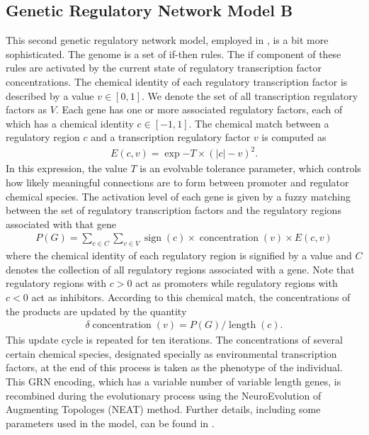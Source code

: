 \subsection{Genetic Regulatory Network Model B} \label{sec:complex_grn}

This second genetic regulatory network model, employed in \cite{Reisinger2007AcquiringRepresentations}, is a bit more sophisticated. The genome is a set of if-then rules. The if component of these rules are activated by the current state of regulatory transcription factor concentrations. The chemical identity of each regulatory transcription factor is described by a value $v \in [0,1]$. We denote the set of all transcription regulatory factors as $V$. Each gene has one or more associated regulatory factors, each of which has a chemical identity $c \in [-1,1]$. The chemical match between a regulatory region $c$ and a transcription regulatory factor $v$ is computed as
\begin{align*}
E(c,v) = \exp{-T \times (|c| - v)^2}.
\end{align*}
In this expression, the value $T$ is an evolvable tolerance parameter, which controls how likely meaningful connections are to form between promoter and regulator chemical species. The activation level of each gene is given by a fuzzy matching between the set of regulatory transcription factors and the regulatory regions associated with that gene
\begin{align*}
P(G) = \sum_{c\in C} \sum_{v \in V} \operatorname{sign}(c) \times \operatorname{concentration}(v) \times E(c,v)
\end{align*}
where the chemical identity of each regulatory region is signified by a value  and $C$ denotes the collection of all regulatory regions associated with a gene. Note that regulatory regions with $c > 0$ act as promoters while regulatory regions with $c < 0$ act as inhibitors. According to this chemical match, the concentrations of the products are updated by the quantity
\begin{align*}
\delta \operatorname{concentration}(v) = P(G)/\operatorname{length}(c).
\end{align*}
This update cycle is repeated for ten iterations. The concentrations of several certain chemical species, designated specially as environmental transcription factors, at the end of this process is taken as the phenotype of the individual. This GRN encoding, which has a variable number of variable length genes, is recombined during the evolutionary process using the NeuroEvolution of Augmenting Topologes (NEAT) method. Further details, including some parameters used in the model, can be found in \cite{Reisinger2005TowardsEvolvability}.

